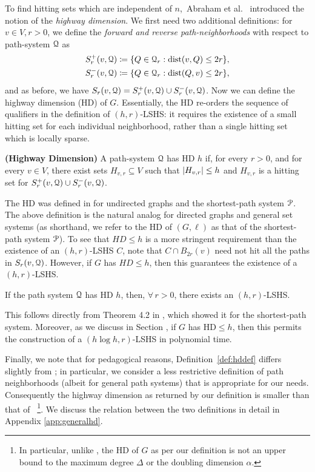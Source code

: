 To find hitting sets which are independent of $n$,~Abraham et al.~\cite{highway2013} introduced the notion of the \emph{highway dimension}. We first need two additional definitions:
for $v\in V, r>0$, we define the \emph{forward and reverse path-neighborhoods} with respect to path-system $\mathcal{Q}$ as 
\begin{align*}
S_r^+(v,\calQ) &\defeq\crl*{Q\in\calQ_r: \dist(v,Q)\leq 2r}, \\  
S_r^-(v,\calQ) &\defeq\crl*{Q\in\calQ_r: \dist(Q,v)\leq 2r},
\end{align*}
and as before, we have $S_r(v,\mathcal{Q}) = S_r^+(v,\mathcal{Q})\cup S_r^-(v,\mathcal{Q})$. Now we can define the highway dimension (HD) of $G$. Essentially, the HD re-orders the sequence of qualifiers in the definition of $(h,r)$-LSHS: it requires the existence of a small hitting set for each individual neighborhood, rather than a single hitting set which is locally sparse. 
\begin{definition}
\label{def:hddef}
\textbf{(Highway Dimension)}
A path-system $\mathcal{Q}$ has HD $h$ if, for every $r>0$, and for every $v\in V$, there exist sets $H_{v,r}\subseteq V$ such that $\lvert H_{v,r}\rvert\leq h$ and $H_{v,r}$ is a hitting set for $S_r^+(v,\mathcal{Q})\cup S_r^-(v,\mathcal{Q})$.
\end{definition}
The HD was defined in \cite{highway2013} for undirected graphs and the shortest-path system $\mathcal{P}$. 
The above definition is the natural analog for directed graphs and general set systems (as shorthand, we refer to the HD of $(G,\ell)$ as that of the shortest-path system $\mathcal{P}$). 
To see that $HD\leq h$ is a more stringent requirement than the existence of an $(h,r)$-LSHS $C$, note that $C\cap B_{2r}(v)$ need not hit all the paths in $S_r(v,\mathcal{Q})$. 
However, if $G$ has $HD\leq h$, then this guarantees the existence of a $(h,r)$-LSHS.
\begin{proposition}
If the path system $\mathcal{Q}$ has HD $h$, then, $\forall\,r>0$, there exists an $(h,r)$-LSHS.
\end{proposition}
This follows directly from Theorem 4.2 in \cite{highway2013}, which showed it for the shortest-path system. Moreover, as we discuss in Section , if $G$ has HD$\leq h$, then this permits the construction of a $(h\log h,r)$-LSHS in polynomial time.


Finally, we note that for pedagogical reasons, Definition~\ref{def:hddef} differs slightly from \cite{highway2013}; in particular, we consider a less restrictive definition of path neighborhoods (albeit for general path systems) that is appropriate for our needs. Consequently the highway dimension as returned by our definition is smaller than that of \cite{highway2013}~\footnote{In particular, unlike \cite{highway2013}, the HD of $G$ as per our definition is not an upper bound to the maximum degree $\Delta$ or the doubling dimension $\alpha$.}.
We discuss the relation between the two definitions in detail in Appendix \ref{app:generalhd}. 

